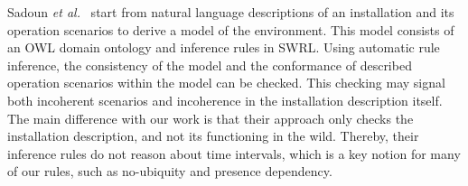 Sadoun {\em et al.}~\cite{SADOUN-ONTOLOGY-MICAI2011} start from natural language descriptions of an installation and its operation scenarios to derive a model of the environment. This model consists of an OWL domain ontology and inference rules in SWRL.  Using automatic rule inference, the consistency of the model and the conformance of described operation scenarios within the model can be checked.  This checking may signal both incoherent scenarios and incoherence in the installation description itself.  The main difference with our work is that their approach only checks the installation description, and not its functioning in the wild. Thereby, their inference rules do not reason about time intervals, which is a key notion for many of our rules, such as no-ubiquity and presence dependency.
